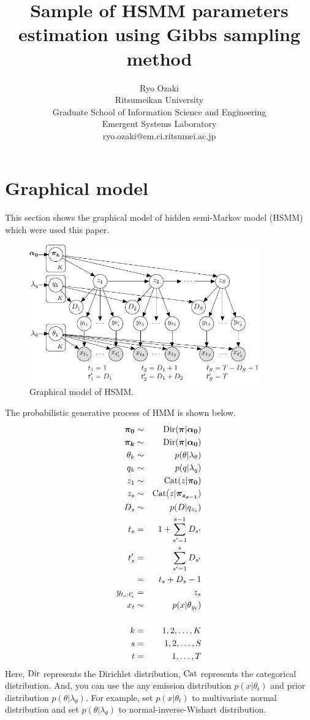 \documentclass[a4paper]{article}
\title{Sample of HSMM parameters estimation using Gibbs sampling method}
\author{
	Ryo Ozaki\\
	Ritsumeikan University\\
	Graduate School of Information Science and Engineering\\
	Emergent Systems Laboratory\\
	ryo.ozaki@em.ci.ritsumei.ac.jp
}
\DeclareMathOperator{\Cat}{\rm Cat}
\DeclareMathOperator{\Dir}{\rm Dir}
\begin{document}
\maketitle
\section{Graphical model}
This section shows the graphical model of hidden semi-Markov model (HSMM) which were used this paper.
\begin{figure}[ht]
	\begin{center}
		\includegraphics[width=10cm]{fig/HSMM_graphical_model.pdf}
		\caption{Graphical model of HSMM.}
	\end{center}
\end{figure}

The probabilistic generative process of HMM is shown below.
\begin{eqnarray}
	\boldsymbol{\pi_0} &\sim& \Dir(\boldsymbol{\pi} | \boldsymbol{\alpha_0}) \\
	\boldsymbol{\pi_{k}} &\sim& \Dir(\boldsymbol{\pi} | \boldsymbol{\alpha_0}) \\
	\theta_k &\sim& p(\theta | \lambda_\theta) \\
	q_k &\sim& p(q | \lambda_q) \\
	z_1 &\sim& \Cat(z | \boldsymbol{\pi_0})\\
	z_s &\sim& \Cat(z | \boldsymbol{\pi_{z_{s-1}}})\\
	D_s &\sim& p(D | q_{z_s}) \\
	t_s &=& 1 + \sum_{s'=1}^{s-1}{D_{s'}} \\
	t'_s &=& \sum_{s'=1}^{s}{D_{s'}} \\
	&=& t_s + D_s - 1 \\
	y_{t_s:t'_s} &=& z_s \\
	x_t  &\sim& p(x | \theta_{y_t})\\
	\nonumber \\
	k &=& 1, 2, \ldots, K \\
	s &=& 1, 2, \ldots, S \\
	t &=& 1, \ldots, T
\end{eqnarray}
Here, $\Dir$ represents the Dirichlet distribution, $\Cat$ represents the categorical distribution.
And, you can use the any emission distribution $p(x | \theta_{t})$ and prior  distribution $p(\theta | \lambda_\theta)$.
For example, set $p(x | \theta_{t})$ to multivariate normal distribution and set $p(\theta | \lambda_\theta)$ to normal-inverse-Wishart distribution.
\end{document}
